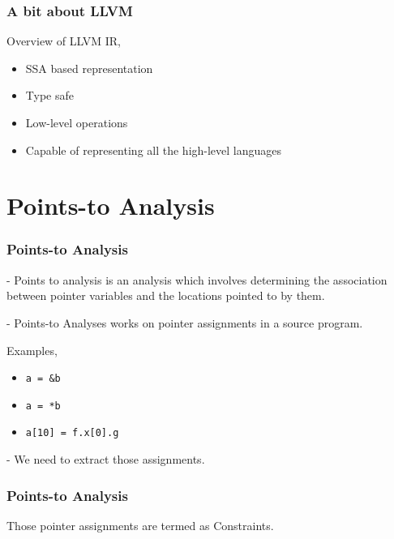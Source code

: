 \documentclass{beamer}
\begin{document}
\begin{frame}
\frametitle{A bit about LLVM}
Overview of LLVM IR,
\begin{itemize}
	\item<1-> SSA based representation
	\item<2-> Type safe
	\item<3-> Low-level operations
	\item<4-> Capable of representing all the high-level languages
\end{itemize}

\end{frame}

\section{Points-to Analysis}

\begin{frame}
\frametitle{Points-to Analysis}
- Points to analysis is an analysis which involves determining the association between
pointer variables and the locations pointed to by them.

\vspace{15pt}

\pause
- Points-to Analyses works on pointer assignments in a source program.

\pause
Examples,
\begin{itemize}
	\item<1-> \texttt{a = \&b}
	\item<2-> \texttt{a = *b}
	\item<3-> \texttt{a[10] = f.x[0].g}
\end{itemize}

\vspace{15pt}

\pause
\alert{- We need to extract those assignments.}

\end{frame}

\begin{frame}
\frametitle{Points-to Analysis}
Those pointer assignments are termed as Constraints.
\end{frame}
\end{document}
